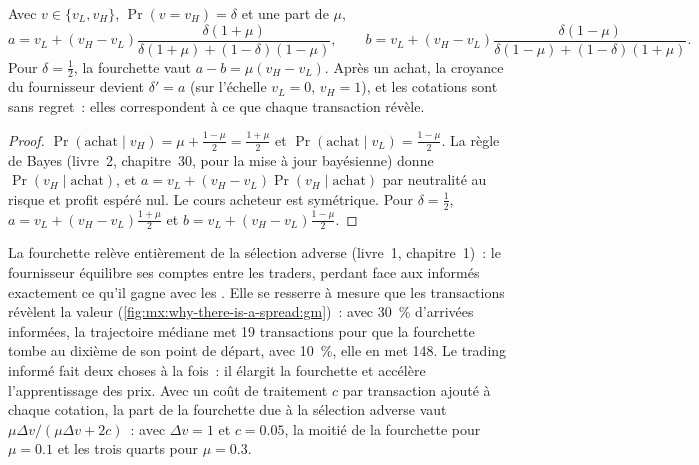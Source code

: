 \begin{proposition}\label{prop:mx:why-there-is-a-spread:gmquotes}
Avec $v\in\{v_L,v_H\}$, $\Pr(v=v_H)=\delta$ et une part de  $\mu$,
\[
a = v_L+(v_H-v_L)\frac{\delta(1+\mu)}{\delta(1+\mu)+(1-\delta)(1-\mu)},\qquad
b = v_L+(v_H-v_L)\frac{\delta(1-\mu)}{\delta(1-\mu)+(1-\delta)(1+\mu)}.
\]
Pour $\delta=\tfrac12$, la fourchette vaut $a-b=\mu(v_H-v_L)$. Après un achat, la croyance du fournisseur devient $\delta'=a$ (sur l'échelle $v_L=0$, $v_H=1$), et les
cotations sont sans regret~: elles correspondent à ce que chaque transaction révèle.
\end{proposition}

\begin{proof}
$\Pr(\text{achat}\mid v_H)=\mu+\tfrac{1-\mu}{2}=\tfrac{1+\mu}{2}$ et $\Pr(\text{achat}\mid v_L)=\tfrac{1-\mu}{2}$. La règle de Bayes (livre~2, chapitre~30,
pour la mise à jour bayésienne) donne $\Pr(v_H\mid\text{achat})$, et $a=v_L+(v_H-v_L)\Pr(v_H\mid\text{achat})$ par neutralité au risque et profit espéré nul. Le cours acheteur est
symétrique. Pour $\delta=\tfrac12$, $a=v_L+(v_H-v_L)\tfrac{1+\mu}{2}$ et $b=v_L+(v_H-v_L)\tfrac{1-\mu}{2}$.
\end{proof}

\label{lst:mx:why-there-is-a-spread:gm}

La fourchette relève entièrement de la sélection adverse (livre~1, chapitre~1)~: le fournisseur équilibre ses comptes entre les traders, perdant face aux informés exactement ce qu'il
gagne avec les . Elle se resserre à mesure que les transactions révèlent la valeur (\cref{fig:mx:why-there-is-a-spread:gm})~: avec 30~\% d'arrivées informées, la trajectoire médiane met 19
transactions pour que la fourchette tombe au dixième de son point de départ, avec 10~\%, elle en met 148. Le trading informé fait deux choses à la fois~: il élargit la fourchette et accélère
l'apprentissage des prix. Avec un coût de traitement $c$ par transaction ajouté à chaque cotation, la part de la fourchette due à la sélection adverse vaut $\mu\Delta v/(\mu\Delta
v+2c)$~: avec $\Delta v=1$ et $c=0.05$, la moitié de la fourchette pour $\mu=0.1$ et les trois quarts pour $\mu=0.3$.

